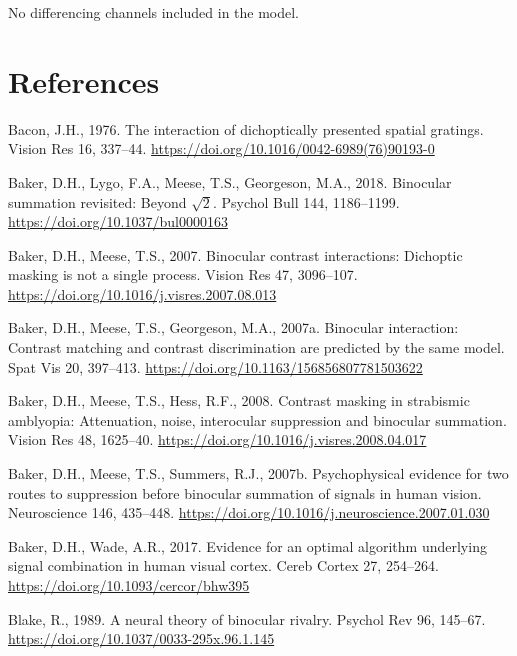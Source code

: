 \documentclass[
  12pt,
]{article}
\newlength{\cslhangindent}
\newenvironment{CSLReferences}[2] %
 {\begin{list}{}{%
  \setlength{\itemindent}{0pt}
  \setlength{\leftmargin}{0pt}
  \setlength{\parsep}{0pt}
  \ifodd #1
   \setlength{\leftmargin}{\cslhangindent}
   \setlength{\itemindent}{-1\cslhangindent}
  \fi
  \setlength{\itemsep}{#2\baselineskip}}}
 {\end{list}}
\begin{document}
No differencing channels included in the model.

\section*{References}\label{references}

\label{refs}
\begin{CSLReferences}{1}{0}
Bacon, J.H., 1976. The interaction of dichoptically presented spatial
gratings. Vision Res 16, 337--44.
\url{https://doi.org/10.1016/0042-6989(76)90193-0}

Baker, D.H., Lygo, F.A., Meese, T.S., Georgeson, M.A., 2018. Binocular
summation revisited: Beyond \(\sqrt{2}\). Psychol Bull 144, 1186--1199.
\url{https://doi.org/10.1037/bul0000163}

Baker, D.H., Meese, T.S., 2007. Binocular contrast interactions:
Dichoptic masking is not a single process. Vision Res 47, 3096--107.
\url{https://doi.org/10.1016/j.visres.2007.08.013}

Baker, D.H., Meese, T.S., Georgeson, M.A., 2007a. Binocular interaction:
Contrast matching and contrast discrimination are predicted by the same
model. Spat Vis 20, 397--413.
\url{https://doi.org/10.1163/156856807781503622}

Baker, D.H., Meese, T.S., Hess, R.F., 2008. Contrast masking in
strabismic amblyopia: Attenuation, noise, interocular suppression and
binocular summation. Vision Res 48, 1625--40.
\url{https://doi.org/10.1016/j.visres.2008.04.017}

Baker, D.H., Meese, T.S., Summers, R.J., 2007b. Psychophysical evidence
for two routes to suppression before binocular summation of signals in
human vision. Neuroscience 146, 435--448.
\url{https://doi.org/10.1016/j.neuroscience.2007.01.030}

Baker, D.H., Wade, A.R., 2017. Evidence for an optimal algorithm
underlying signal combination in human visual cortex. Cereb Cortex 27,
254--264. \url{https://doi.org/10.1093/cercor/bhw395}

Blake, R., 1989. A neural theory of binocular rivalry. Psychol Rev 96,
145--67. \url{https://doi.org/10.1037/0033-295x.96.1.145}


\end{CSLReferences}
\end{document}
